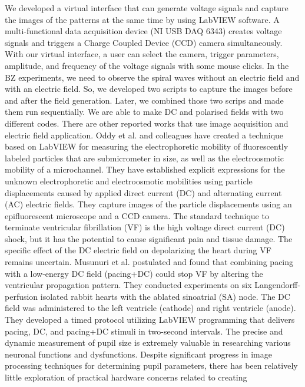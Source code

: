 \documentclass[journal=jacsat,manuscript=article]{achemso}
\begin{document}
We developed a virtual interface that can generate voltage signals and
capture the images of the patterns at the same time by using LabVIEW
software. A multi-functional data acquisition device (NI USB DAQ 6343)
creates voltage signals and triggers a Charge Coupled Device (CCD)
camera simultaneously. With our virtual interface, a user can select
the camera, trigger parameters, amplitude, and frequency of the
voltage signals with some mouse clicks. In the BZ experiments, we need
to observe the spiral waves without an electric field and with an
electric field. So, we developed two scripts to capture the images
before and after the field generation. Later, we combined those two
scrips and made them run sequentially. We are able to make DC and
polarised fields with two different codes.  There are other reported
works that use image acquisition and electric field
application. \cite{oddy2004method} Oddy et al. and colleagues have
created a technique based on LabVIEW for measuring the electrophoretic
mobility of fluorescently labeled particles that are submicrometer in
size, as well as the electroosmotic mobility of a microchannel. They
have established explicit expressions for the unknown electrophoretic
and electroosmotic mobilities using particle displacements caused by
applied direct current (DC) and alternating current (AC) electric
fields. They capture images of the particle displacements using an
epifluorescent microscope and a CCD camera.  The standard technique to
terminate ventricular fibrillation (VF) is the high voltage direct
current (DC) shock, but it has the potential to cause significant pain
and tissue damage. The specific effect of the DC electric field on
depolarizing the heart during VF remains
uncertain. \cite{musunuri2009ventricular} Musunuri et al. postulated
and found that combining pacing with a low-energy DC field (pacing+DC)
could stop VF by altering the ventricular propagation pattern. They
conducted experiments on six Langendorff-perfusion isolated rabbit
hearts with the ablated sinoatrial (SA) node. The DC field was
administered to the left ventricle (cathode) and right ventricle
(anode). They developed a timed protocol utilizing LabVIEW programming
that delivers pacing, DC, and pacing+DC stimuli in two-second
intervals.  The precise and dynamic measurement of pupil size is
extremely valuable in researching various neuronal functions and
dysfunctions. Despite significant progress in image processing
techniques for determining pupil parameters, there has been relatively
little exploration of practical hardware concerns related to creating
\end{document}
